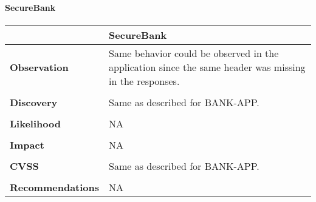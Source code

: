 \paragraph{SecureBank} \mbox{}
\begin{longtable*}{p{.20\textwidth} | p{.75\textwidth}}
    \hline
    & \textbf{SecureBank} \\
    \hline
    \textbf{Observation} &
        Same behavior could be observed in the application since the same header was missing in the responses.
    \\\\
    \textbf{Discovery} &
    Same as described for BANK-APP.
    \\\\
    \textbf{Likelihood} &
        NA
    \\\\
    \textbf{Impact} &
		NA
    \\\\
    \textbf{CVSS} &
		Same as described for BANK-APP.
    \\\\
    \textbf{Recommendations} &
    NA
    \\
    \hline
\end{longtable*}
\clearpage